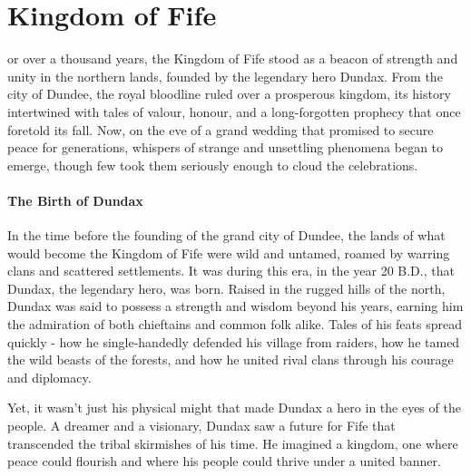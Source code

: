 \chapter{Kingdom of Fife}
{\entryfont {}or over a thousand years, the Kingdom of Fife stood as a beacon of strength and unity in the northern lands, founded by the legendary hero Dundax. From the city of Dundee, the royal bloodline ruled over a prosperous kingdom, its history intertwined with tales of valour, honour, and a long-forgotten prophecy that once foretold its fall. Now, on the eve of a grand wedding that promised to secure peace for generations, whispers of strange and unsettling phenomena began to emerge, though few took them seriously enough to cloud the celebrations.

}

\subsubsection*{The Birth of Dundax}
{\entryfont In the time before the founding of the grand city of Dundee, the lands of what would become the Kingdom of Fife were wild and untamed, roamed by warring clans and scattered settlements. It was during this era, in the year 20 B.D., that Dundax, the legendary hero, was born. Raised in the rugged hills of the north, Dundax was said to possess a strength and wisdom beyond his years, earning him the admiration of both chieftains and common folk alike. Tales of his feats spread quickly - how he single-handedly defended his village from raiders, how he tamed the wild beasts of the forests, and how he united rival clans through his courage and diplomacy.

Yet, it wasn't just his physical might that made Dundax a hero in the eyes of the people. A dreamer and a visionary, Dundax saw a future for Fife that transcended the tribal skirmishes of his time. He imagined a kingdom, one where peace could flourish and where his people could thrive under a united banner.}

